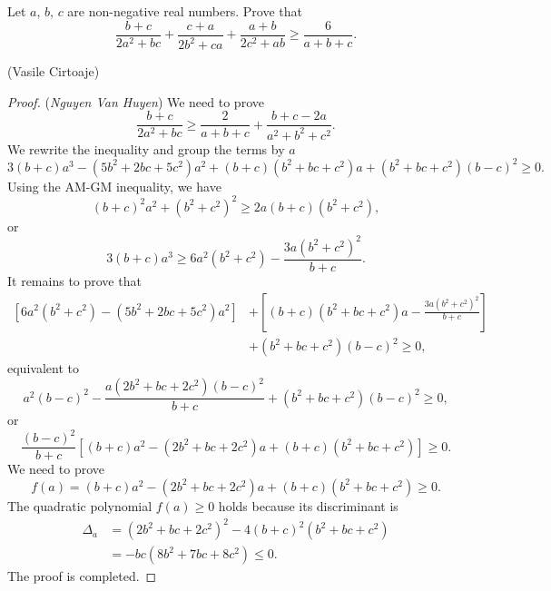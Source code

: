 \documentclass[12pt,a4paper]{book}
\begin{document}
\begin{pro}
Let $a, \, b, \, c$ are non-negative real numbers. Prove that
$$\frac{b+c}{2a^2+bc}+\frac{c+a}{2b^2+ca}+\frac{a+b}{2c^2+ab} \geq \frac{6}{a+b+c}.$$
\begin{flushright}(Vasile Cirtoaje)\end{flushright}
\end{pro}

\begin{proof}
(\textit{Nguyen Van Huyen}) We need to prove
\[ \frac{b+c}{2a^2+bc} \ge \frac{2}{a+b+c}+ \frac{b+c-2a}{a^2+b^2+c^2}.\]
We rewrite the inequality and group the terms by $a$
\[3(b+c)a^3 - (5b^2+2bc+5c^2)a^2+(b+c)(b^2+bc+c^2)a+(b^2+bc+c^2)(b-c)^2 \geqslant 0.\]
Using the AM-GM inequality, we have
\[(b+c)^2a^2 + (b^2+c^2)^2 \ge 2a(b+c)(b^2+c^2),\]
or
\[3(b+c)a^3 \ge 6a^2(b^2+c^2) - \frac{3a(b^2+c^2)^2}{b+c}.\]
It remains to prove that
\[\begin{aligned}
[6a^2(b^2+c^2) - (5b^2+2bc+5c^2)a^2]  & + \left[(b+c)(b^2+bc+c^2)a- \frac{3a(b^2+c^2)^2}{b+c}\right]\\&+(b^2+bc+c^2)(b-c)^2 \geqslant 0,\end{aligned}\]
equivalent to
\[a^2(b-c)^2 - \frac{a(2b^2+bc+2c^2)(b-c)^2}{b+c}+(b^2+bc+c^2)(b-c)^2 \ge 0,\]
or
\[\frac{(b-c)^2}{b+c}[(b+c)a^2-(2b^2+bc+2c^2)a+(b+c)(b^2+bc+c^2)] \ge 0.\]
We need to prove
$$f(a) = (b+c)a^2 - (2b^2+bc+2c^2)a + (b+c)(b^2+bc+c^2) \ge 0.$$
The quadratic polynomial $f(a) \ge 0$ holds because its discriminant is
\[\begin{aligned}
\Delta_a &= (2b^2+bc+2c^2)^2 - 4(b+c)^2(b^2+bc+c^2) \\
& = - bc (8b^2+7bc+8c^2) \le 0.
\end{aligned}\]
The proof is completed.
\end{proof}
\end{document}

